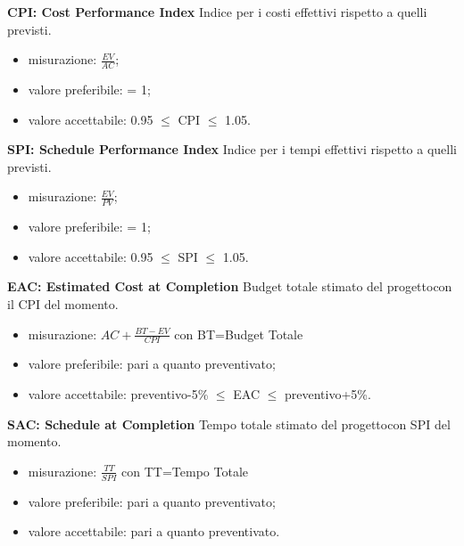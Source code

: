 				\textbf{CPI: Cost Performance Index} Indice per i costi effettivi rispetto a quelli previsti.
				\begin{itemize}
					\item misurazione: $\frac{EV}{AC}$;
					\item valore preferibile: = 1;
					\item valore accettabile: 0.95 $\le$ CPI $\le$ 1.05.
				\end{itemize}
				\textbf{SPI: Schedule Performance Index} Indice per i tempi effettivi rispetto a quelli previsti.
				\begin{itemize}
					\item misurazione: $\frac{EV}{PV}$;
					\item valore preferibile: = 1;
					\item valore accettabile: 0.95 $\le$ SPI $\le$ 1.05.
				\end{itemize}
				\textbf{EAC: Estimated Cost at Completion} Budget totale stimato del progetto\glosp con il CPI del momento.
				\begin{itemize}
					\item misurazione: $AC+ \frac{BT-EV}{CPI}$ con BT=Budget Totale
					\item valore preferibile: pari a quanto preventivato;
					\item valore accettabile: preventivo-5\% $\le$ EAC $\le$ preventivo+5\%.
				\end{itemize}
				\textbf{SAC: Schedule at Completion} Tempo totale stimato del progetto\glosp con SPI del momento.
				\begin{itemize}
					\item misurazione: $\frac{TT}{SPI}$ con TT=Tempo Totale
					\item valore preferibile: pari a quanto preventivato;
					\item valore accettabile: pari a quanto preventivato.
				\end{itemize}
				
